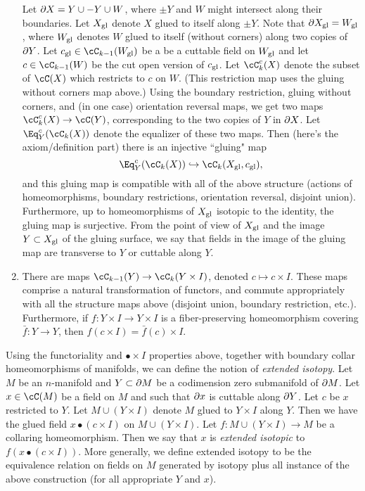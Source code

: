 \documentclass[11pt,leqno]{amsart}
\begin{document}
\begin{enumerate}
Let $\partial X = Y \cup -Y \cup W$, where $\pm Y$ and $W$ might intersect along their boundaries.
Let $X_\mathrm{gl}$ denote $X$ glued to itself along $\pm Y$.
Note that $\partial X_\mathrm{gl} = W_\mathrm{gl}$, where $W_\mathrm{gl}$ denotes $W$ glued to itself
(without corners) along two copies of $\partial Y$.
Let $c\sgl \in \cC_{k-1}(W\sgl)$ be a be a cuttable field on $W_\mathrm{gl}$ and let
$c \in \cC_{k-1}(W)$ be the cut open version of $c_\mathrm{gl}$.
Let $\cC^c_k(X)$ denote the subset of $\cC(X)$ which restricts to $c$ on $W$.
(This restriction map uses the gluing without corners map above.)
Using the boundary restriction, gluing without corners, and (in one case) orientation reversal
maps, we get two maps $\cC^c_k(X) \to \cC(Y)$, corresponding to the two
copies of $Y$ in $\partial X$.
Let $\Eq^c_Y(\cC_k(X))$ denote the equalizer of these two maps.
Then (here's the axiom/definition part) there is an injective ``gluing" map
\[
	\Eq^c_Y(\cC_k(X)) \hookrightarrow \cC_k(X\sgl, c\sgl) ,
\]
and this gluing map is compatible with all of the above structure (actions
of homeomorphisms, boundary restrictions, orientation reversal, disjoint union).
Furthermore, up to homeomorphisms of $X_\mathrm{gl}$ isotopic to the identity,
the gluing map is surjective.
From the point of view of $X_\mathrm{gl}$ and the image $Y \subset X_\mathrm{gl}$ of the 
gluing surface, we say that fields in the image of the gluing map
are transverse to $Y$ or cuttable along $Y$.
\item There are maps $\cC_{k-1}(Y) \to \cC_k(Y \times I)$, denoted
$c \mapsto c\times I$.
These maps comprise a natural transformation of functors, and commute appropriately
with all the structure maps above (disjoint union, boundary restriction, etc.).
Furthermore, if $f: Y\times I \to Y\times I$ is a fiber-preserving homeomorphism
covering $\bar{f}:Y\to Y$, then $f(c\times I) = \bar{f}(c)\times I$.
\end{enumerate}


\bigskip
Using the functoriality and $\bullet\times I$ properties above, together
with boundary collar homeomorphisms of manifolds, we can define the notion of 
{\it extended isotopy}.
Let $M$ be an $n$-manifold and $Y \subset \partial M$ be a codimension zero submanifold
of $\partial M$.
Let $x \in \cC(M)$ be a field on $M$ and such that $\partial x$ is cuttable along $\partial Y$.
Let $c$ be $x$ restricted to $Y$.
Let $M \cup (Y\times I)$ denote $M$ glued to $Y\times I$ along $Y$.
Then we have the glued field $x \bullet (c\times I)$ on $M \cup (Y\times I)$.
Let $f: M \cup (Y\times I) \to M$ be a collaring homeomorphism.
Then we say that $x$ is {\it extended isotopic} to $f(x \bullet (c\times I))$.
More generally, we define extended isotopy to be the equivalence relation on fields
on $M$ generated by isotopy plus all instance of the above construction
(for all appropriate $Y$ and $x$).
\end{document}
